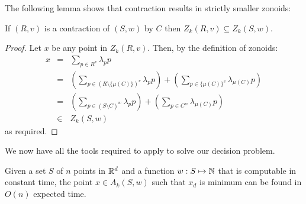 \documentclass[lotsofwhite]{patmorin}
\begin{document}
The following lemma shows that contraction results in strictly smaller
zonoids:

\begin{lem}
If $(R,v)$ is a contraction of $(S,w)$ by $C$ then $Z_k(R,v)
\subseteq Z_k(S,w)$.
\end{lem}

\begin{proof}
Let $x$ be any point in $Z_k(R,v)$.  Then, by the definition of
zonoids:
\begin{eqnarray*}
    x &=& \sum_{p\in R^v} \lambda_pp \\
      &=& \left( \sum_{p\in (R\setminus \{\mu(C)\})^v} \lambda_pp \right)
          + \left( \sum_{p\in \{\mu(C)\}^v}\lambda_{\mu(C)}p \right) \\
      &=& \left(\sum_{p\in (S\setminus C)^w} \lambda_pp \right)
          + \left(\sum_{p\in C^w}\lambda_{\mu(C)} p\right) \\
      &\in& Z_k(S,w)
\end{eqnarray*}
as required.
\end{proof}

We now have all the tools required to apply  to solve our
decision problem.

\begin{thm}
Given a set $S$ of $n$ points in $\mathbb{R}^d$ and a 
function $w:S\mapsto\mathbb{N}$ that is computable in constant
time, the point $x\in A_k(S,w)$ such
that $x_d$ is minimum can be found in $O(n)$ expected
time.
\end{thm}
\end{document}
